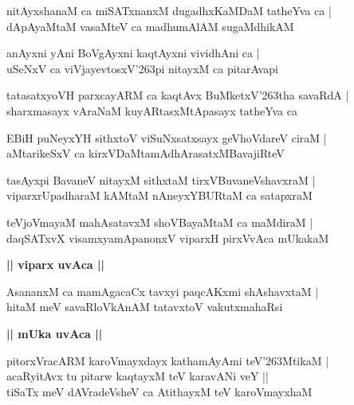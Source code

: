 \documentclass[twoside,12pt,openright]{book}
\def\S{\char'263}
\newcounter{shloka}[chapter]
\def\uvaca#1{\centerline{{\large\textbf{#1}}}}
\begin{document}
\begin{shloka}%
nitAyxshanaM ca miSATxnanxM dugadhxKaMDaM tatheYva ca |\\
dApAyaMtaM vasaMteV ca madhumAlAM sugaMdhikAM 
\end{shloka}

\begin{shloka}%
anAyxni yAni BoVgAyxni kaqtAyxni vividhAni ca |\\
uSeNxV ca viVjayevtosxV\S pi nitayxM ca pitarAvapi
\end{shloka}

\begin{shloka}%
tatasatxyoVH parxcayARM ca kaqtAvx BuMketxV\S tha savaRdA |\\
sharxmasayx vAraNaM kuyARtasxMtApasayx tatheYva ca 
\end{shloka}

\begin{shloka}%
EBiH puNeyxYH sithxtoV viSuNxsatxsayx geVhoVdareV ciraM |\\
aMtarikeSxV ca kirxVDaMtamAdhArasatxMBavajiRteV 
\end{shloka}

\begin{shloka}%
tasAyxpi BavaneV nitayxM sithxtaM tirxVBuvaneVshavxraM |\\
viparxrUpadharaM kAMtaM nAneyxYBURtaM ca satapxraM 
\end{shloka}

\begin{shloka}%
teVjoVmayaM mahAsatavxM shoVBayaMtaM ca maMdiraM |\\
daqSATxvX visamxyamApanonxV viparxH pirxVvAca mUkakaM 
\end{shloka}

\uvaca{|| viparx uvAca ||}

\begin{shloka}%
AsananxM ca mamAgacaCx tavxyi paqcAKxmi shAshavxtaM |\\
hitaM meV savaRloVkAnAM tatavxtoV vakutxmahaRsi
\end{shloka}

\uvaca{|| mUka uvAca ||}

\begin{shloka}%
pitorxVracARM karoVmayxdayx kathamAyAmi teV\S MtikaM |\\
acaRyitAvx tu pitarw kaqtayxM teV karavANi veY ||\\
tiSaTx meV dAVradeVsheV ca AtithayxM teV karoVmayxhaM \\
\end{shloka}
\end{document}
